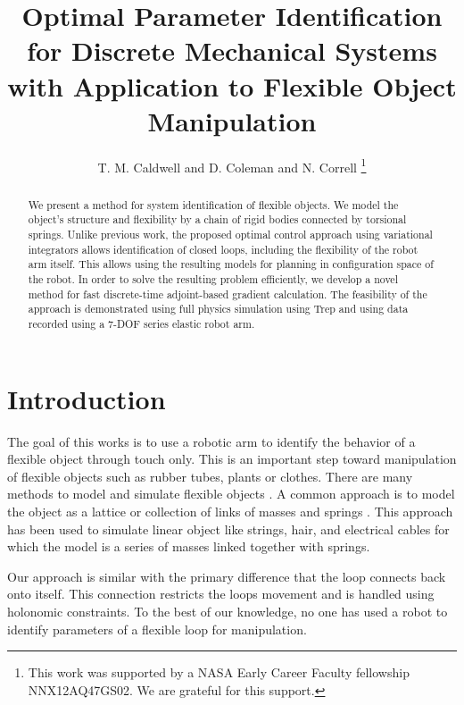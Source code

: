 \documentclass[letterpaper, 10pt, conference]{ieeeconf}
\title{Optimal Parameter Identification for Discrete Mechanical Systems with Application to Flexible Object Manipulation}
\author{T. M. Caldwell and  D. Coleman and N. Correll%
\thanks{
This work was supported by a NASA
Early Career Faculty fellowship NNX12AQ47GS02. We are grateful for this support.}%
}
\begin{document}
\maketitle

\begin{abstract}
We present a method for system identification of flexible objects. We model the object's structure and flexibility by a chain of rigid bodies connected by torsional springs. Unlike previous work, the proposed optimal control approach using variational integrators allows identification of closed loops, including the flexibility of the robot arm itself. This allows using the resulting models for planning in configuration space of the robot. In order to solve the resulting problem efficiently, we develop a novel method for fast discrete-time adjoint-based gradient calculation. The feasibility of the approach is demonstrated using full physics simulation using Trep and using data recorded using a 7-DOF series elastic robot arm.
\end{abstract}

\section{Introduction}
The goal of this works is to use a robotic arm to identify the behavior of a flexible object through touch only. This is an important step toward manipulation of flexible objects such as rubber tubes, plants or clothes.  
There are many methods to model and simulate flexible objects \cite{khalil_payeur, lang_etal}.  A common approach is to model the object as a lattice or collection of links of masses and springs \cite{sahari_etal, wakamatsu_etal, khalil_payeur}.  This approach has been used to simulate linear object like strings, hair, and electrical cables for which the model is a series of masses linked together with springs. %

Our approach is similar with the primary difference that the loop connects back onto itself.  This connection restricts the loops movement and is handled using holonomic constraints.  To the best of our knowledge, no one has used a robot to identify parameters of a flexible loop for manipulation.
\end{document}

